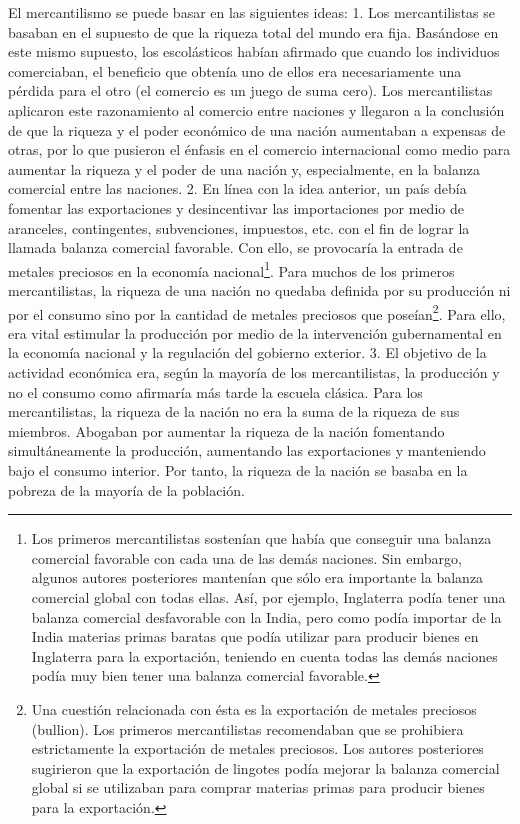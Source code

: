 \documentclass[10pt,a4paper]{article}
\begin{document}
El mercantilismo se puede basar en las siguientes ideas:
1.
Los mercantilistas se basaban en el supuesto de que la riqueza total del mundo era fija. Basándose en este mismo supuesto, los escolásticos habían afirmado que cuando los individuos comerciaban, el beneficio que obtenía uno de ellos era necesariamente una pérdida para el otro (el comercio es un juego de suma cero). Los mercantilistas aplicaron este razonamiento al comercio entre naciones y llegaron a la conclusión de que la riqueza y el poder económico de una nación aumentaban a expensas de otras, por lo que pusieron el énfasis en el comercio internacional como medio para aumentar la riqueza y el poder de una nación y, especialmente, en la balanza comercial entre las naciones.
2.
En línea con la idea anterior, un país debía fomentar las exportaciones y desincentivar las importaciones por medio de aranceles, contingentes, subvenciones, impuestos, etc. con el fin de lograr la llamada balanza comercial favorable. Con ello, se provocaría la entrada de metales preciosos
en la economía nacional\footnote{%
    Los primeros mercantilistas sostenían que había que conseguir una balanza comercial favorable con cada una de las demás naciones. Sin embargo, algunos autores posteriores mantenían que sólo era importante la balanza comercial global con todas ellas. Así, por ejemplo, Inglaterra podía tener una balanza comercial desfavorable con la India, pero como podía importar de la India materias primas baratas que podía utilizar para producir bienes en Inglaterra para la exportación, teniendo en cuenta todas las demás naciones podía muy bien tener una balanza comercial favorable.
}. Para muchos de los primeros mercantilistas, la riqueza de una nación no quedaba definida por su producción ni por el consumo sino por la cantidad de metales preciosos que poseían\footnote{%
    Una cuestión relacionada con ésta es la exportación de metales preciosos (bullion). Los primeros mercantilistas recomendaban que se prohibiera estrictamente la exportación de metales preciosos. Los autores posteriores sugirieron que la exportación de lingotes podía mejorar la balanza comercial global si se utilizaban para comprar materias primas para producir bienes para la exportación.
}. Para ello, era vital estimular la producción por medio de la intervención gubernamental en la economía nacional y la regulación del gobierno exterior.
3.
El objetivo de la actividad económica era, según la mayoría de los mercantilistas, la producción y no el consumo como afirmaría más tarde la escuela clásica. Para los mercantilistas, la riqueza de la nación no era la suma de la riqueza de sus miembros. Abogaban por aumentar la riqueza de la nación fomentando simultáneamente la producción, aumentando las exportaciones y manteniendo bajo el consumo interior. Por tanto, la riqueza de la nación se basaba en la pobreza de la mayoría de la población.
\end{document}
